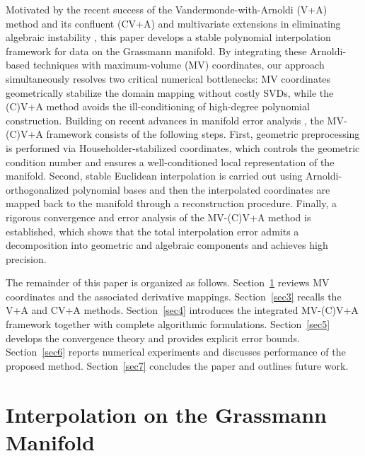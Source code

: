 \documentclass[11pt]{article}
\begin{document}
Motivated by the recent success of the Vandermonde-with-Arnoldi (V+A) method and its confluent (CV+A) and multivariate extensions in eliminating algebraic instability \cite{brubeck2021vandermonde, niu2022confluent, zhang2025multivariate, zhu2025convergence}, this paper develops a stable polynomial interpolation framework for data on the Grassmann manifold. By integrating these Arnoldi-based techniques with maximum-volume (MV) coordinates, our approach simultaneously resolves two critical numerical bottlenecks: MV coordinates geometrically stabilize the domain mapping without costly SVDs, while the (C)V+A method avoids the ill-conditioning of high-degree polynomial construction. Building on recent advances in manifold error analysis \cite{zimmermann2025high, mataigne2024bounds, seguin2024hermite}, the MV-(C)V+A framework consists of the following steps.
First, geometric preprocessing is performed via Householder-stabilized coordinates, which controls the geometric condition number and ensures a well-conditioned local representation of the manifold.
Second, stable Euclidean interpolation is carried out using Arnoldi-orthogonalized polynomial bases and then the interpolated coordinates are   mapped back to the manifold through a reconstruction procedure.
Finally, a rigorous convergence and error analysis of the MV-(C)V+A method is established, which shows that the total interpolation error admits a decomposition into geometric and algebraic components and achieves high precision.

The remainder of this paper is organized as follows. Section~\ref{sec2} reviews MV coordinates and the associated derivative mappings. Section~\ref{sec3} recalls the V+A and CV+A methods. Section~\ref{sec4} introduces the integrated MV-(C)V+A framework together with complete algorithmic formulations. Section~\ref{sec5} develops the convergence theory and provides explicit error bounds. Section~\ref{sec6} reports numerical experiments and discusses performance of the proposed method. Section~\ref{sec7} concludes the paper and outlines future work.


\section{Interpolation on the Grassmann Manifold}
\label{sec2}

\end{document}
